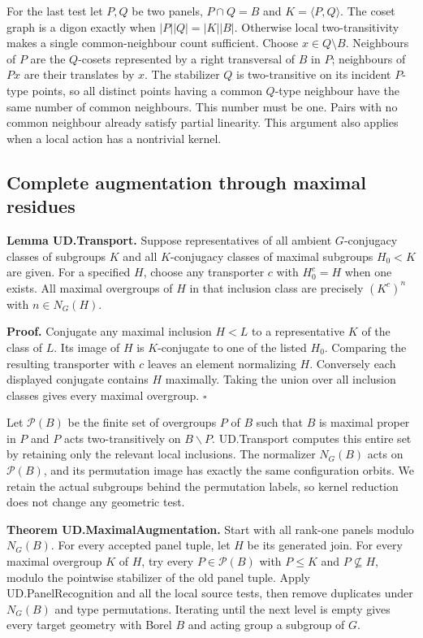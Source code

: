For the last test let \(P,Q\) be two panels, \(P\cap Q=B\) and
\(K=\langle P,Q\rangle\). The coset graph is a digon exactly when
\(|P||Q|=|K||B|\). Otherwise local two-transitivity makes a single
common-neighbour count sufficient. Choose \(x\in Q\setminus B\).
Neighbours of \(P\) are the \(Q\)-cosets represented by a right
transversal of \(B\) in \(P\); neighbours of \(Px\) are their translates
by \(x\). The stabilizer \(Q\) is two-transitive on its incident
\(P\)-type points, so all distinct points having a common \(Q\)-type
neighbour have the same number of common neighbours. This number must be
one. Pairs with no common neighbour already satisfy partial linearity.
This argument also applies when a local action has a nontrivial kernel.

\subsection{Complete augmentation through maximal
residues}\label{complete-augmentation-through-maximal-residues}

\textbf{Lemma UD.Transport.} Suppose representatives of all ambient
\(G\)-conjugacy classes of subgroups \(K\) and all \(K\)-conjugacy
classes of maximal subgroups \(H_0<K\) are given. For a specified \(H\),
choose any transporter \(c\) with \(H_0^c=H\) when one exists. All
maximal overgroups of \(H\) in that inclusion class are precisely
\((K^c)^n\) with \(n\in N_G(H)\).

\textbf{Proof.} Conjugate any maximal inclusion \(H<L\) to a
representative \(K\) of the class of \(L\). Its image of \(H\) is
\(K\)-conjugate to one of the listed \(H_0\). Comparing the resulting
transporter with \(c\) leaves an element normalizing \(H\). Conversely
each displayed conjugate contains \(H\) maximally. Taking the union over
all inclusion classes gives every maximal overgroup. \(\square\)

Let \(\mathcal P(B)\) be the finite set of overgroups \(P\) of \(B\)
such that \(B\) is maximal proper in \(P\) and \(P\) acts
two-transitively on \(B\backslash P\). UD.Transport computes this entire
set by retaining only the relevant local inclusions. The normalizer
\(N_G(B)\) acts on \(\mathcal P(B)\), and its permutation image has
exactly the same configuration orbits. We retain the actual subgroups
behind the permutation labels, so kernel reduction does not change any
geometric test.

\textbf{Theorem UD.MaximalAugmentation.} Start with all rank-one panels
modulo \(N_G(B)\). For every accepted panel tuple, let \(H\) be its
generated join. For every maximal overgroup \(K\) of \(H\), try every
\(P\in\mathcal P(B)\) with \(P\le K\) and \(P\nsubseteq H\), modulo the
pointwise stabilizer of the old panel tuple. Apply UD.PanelRecognition
and all the local source tests, then remove duplicates under \(N_G(B)\)
and type permutations. Iterating until the next level is empty gives
every target geometry with Borel \(B\) and acting group a subgroup of
\(G\).


